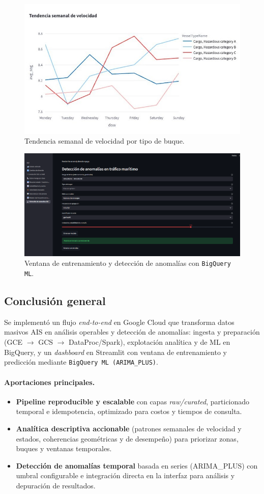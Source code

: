 \documentclass[10pt]{article}
\begin{document}
\begin{figure}[H]
  \centering
  \includegraphics[width=0.6\linewidth]{figures/TendenciaSemanalVel.jpeg}
  \caption{Tendencia semanal de velocidad por tipo de buque.}
  \label{fig:tendencia-semanal-vel}
\end{figure}

\begin{figure}[H]
  \centering
  \includegraphics[width=0.6\linewidth]{figures/Entrenamiento.png}
  \caption{Ventana de entrenamiento y detección de anomalías con \texttt{BigQuery ML}.}
  \label{fig:entrenamiento}
\end{figure}

\subsection{Conclusión general}

Se implementó un flujo \emph{end-to-end} en Google Cloud que transforma datos masivos AIS en análisis operables y detección de anomalías: ingesta y preparación (GCE $\rightarrow$ GCS $\rightarrow$ DataProc/Spark), explotación analítica y de ML en BigQuery, y un \textit{dashboard} en Streamlit con ventana de entrenamiento y predicción mediante \texttt{BigQuery ML (ARIMA\_PLUS)}.

\paragraph{Aportaciones principales.}
\begin{itemize}
  \item \textbf{Pipeline reproducible y escalable} con capas \textit{raw/curated}, particionado temporal e idempotencia, optimizado para costos y tiempos de consulta.
  \item \textbf{Analítica descriptiva accionable} (patrones semanales de velocidad y estados, coherencias geométricas y de desempeño) para priorizar zonas, buques y ventanas temporales.
  \item \textbf{Detección de anomalías temporal} basada en series (ARIMA\_PLUS) con umbral configurable e integración directa en la interfaz para análisis y depuración de resultados.
\end{itemize}
\end{document}
